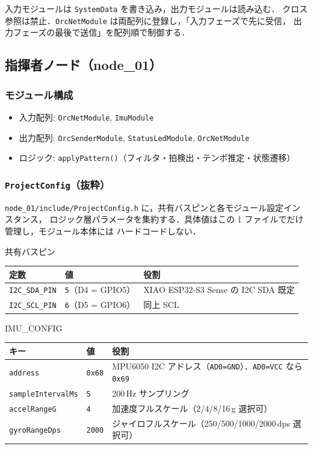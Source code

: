 \documentclass[lualatex,book,paper=a4paper,jafontsize=11.5pt,jafontscale=1.05]{jlreq}
\begin{document}
入力モジュールは \texttt{SystemData} を書き込み，出力モジュールは読み込む．
クロス参照は禁止．\texttt{OrcNetModule} は両配列に登録し，「入力フェーズで先に受信，
出力フェーズの最後で送信」を配列順で制御する．


\subsection{指揮者ノード（node\_01）}\label{subsec:proc-flow-conductor}

\subsubsection{モジュール構成}

\begin{itemize}
  \item 入力配列: \texttt{OrcNetModule}, \texttt{ImuModule}
  \item 出力配列: \texttt{OrcSenderModule}, \texttt{StatusLedModule}, \texttt{OrcNetModule}
  \item ロジック: \texttt{applyPattern()}（フィルタ・拍検出・テンポ推定・状態遷移）
\end{itemize}

\subsubsection{\texttt{ProjectConfig}（抜粋）}

\texttt{node\_01/include/ProjectConfig.h} に，共有バスピンと各モジュール設定インスタンス，
ロジック層パラメータを集約する．具体値はこの 1 ファイルでだけ管理し，モジュール本体には
ハードコードしない．

\begin{apibox}{共有バスピン}
\begin{tabular}{l l p{}}
\toprule
\textbf{定数} & \textbf{値} & \textbf{役割} \\
\midrule
\texttt{I2C\_SDA\_PIN} & \texttt{5}（D4 = GPIO5） & XIAO ESP32-S3 Sense の I2C SDA 既定 \\
\texttt{I2C\_SCL\_PIN} & \texttt{6}（D5 = GPIO6） & 同上 SCL \\
\bottomrule
\end{tabular}
\end{apibox}

\begin{apibox}{IMU\_CONFIG}
\begin{tabular}{l l p{}}
\toprule
\textbf{キー} & \textbf{値} & \textbf{役割} \\
\midrule
\texttt{address}          & \texttt{0x68} & MPU6050 I2C アドレス（\texttt{AD0=GND}）．\texttt{AD0=VCC} なら \texttt{0x69} \\
\texttt{sampleIntervalMs} & \texttt{5}    & 200\,Hz サンプリング \\
\texttt{accelRangeG}      & \texttt{4}    & 加速度フルスケール（2/4/8/16\,g 選択可） \\
\texttt{gyroRangeDps}     & \texttt{2000} & ジャイロフルスケール（250/500/1000/2000\,dps 選択可） \\
\bottomrule
\end{tabular}
\end{apibox}
\end{document}
